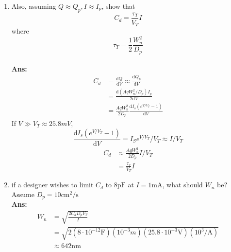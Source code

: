 \documentclass[12pt, a4paper]{article}
\newcommand{\smia}{\si{\milli\ampere}}
\newcommand{\svol}{\si{\volt}}
\newcommand{\dD}{\mathrm{d}}
\newcommand{\Ans}{{\\ \bf Ans:} \\}
\begin{document}
\begin{enumerate}[label=(\alph*)]
  \item Also, assuming $Q \approx Q_p, I \approx I_p$, show that
    \[ C_d = \frac{\tau_T}{V_T} I \]
    where
    \[ \tau_T = \frac{1}{2} \frac{W_n^2}{D_p} \]
    \Ans
    \begin{align*}
      C_d &= \frac{\dD Q}{\dD V} \approx \frac{\dD Q_p}{\dD V} \\
      &= \frac{\dD (A q W_n^2 / D_p) I_p }{2 \dD V} \\
      &= \frac{A q W_n^2}{2 D_p} \frac{\dD I_s \left( e^{V/V_T} - 1 \right)}{\dD V}
    \end{align*}
    If $V \gg V_T \approx 25.8 \si{mV}$, 
    \[ \frac{\dD I_s \left( e^{V/V_T} - 1 \right)}{\dD V} = I_S e^{V/V_T} / V_T \approx I / V_T \]
    \begin{align*}
      C_d &\approx \frac{A q W_n^2}{2 D_p} I / V_T\\
      &= \frac{\tau_T}{V_T} I
    \end{align*}
      
  \item if a designer wishes to limit $C_d$ to $8 \si{\pico\farad}$ at $I = 1\smia$, what should $W_n$ be? Assume $D_p = 10 \si{\centi\meter^2/\second}$ 
    \Ans
    \begin{align*}
      W_n &= \sqrt{ \frac{2 C_d D_p V_T}{I}} \\
          &= \sqrt{ 2 (8 \cdot 10^{-12} \si{\farad}) (10^{-3} \si{m}) (25.8 \cdot 10^{-3} \svol) (10^{3} \si{\per\ampere} ) }\\
      &\approx 642 \si{\nano\meter}
    \end{align*}
\end{enumerate}
\end{document}
